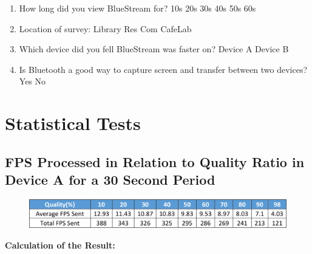 \documentclass[a4paper,12pt]{article}
\begin{document}
\begin{appendices}
\begin{enumerate}
\item How long did you view BlueStream for?
\newline
10s \hspace{1cm} 20s \hspace{1cm} 30s \hspace{1cm} 40s \hspace{1cm} 50s \hspace{1cm} 60s
\newline

\item Location of survey:
\newline
Library \hspace{2cm} Res Com \hspace{2cm} Cafe\hspace{2cm}Lab
\newline

\item Which device did you fell BlueStream was faster on?
\newline
Device A \hspace{2cm} Device B
\newline

\item Is Bluetooth a good way to capture screen and transfer between two devices?
\newline
Yes \hspace{3cm} No
\newline

\end{enumerate}

\newpage
\raggedright
\section{Statistical Tests}
\subsection{FPS Processed in Relation to Quality Ratio in Device A for a 30 Second Period}\label{App:ErrorFPS}

\begin{figure}[h!]
\centering
\includegraphics[scale=.9]{StatisticalTest/Quality1.png}
\end{figure}

\textbf{Calculation of the Result:}


\end{appendices}
\end{document}
